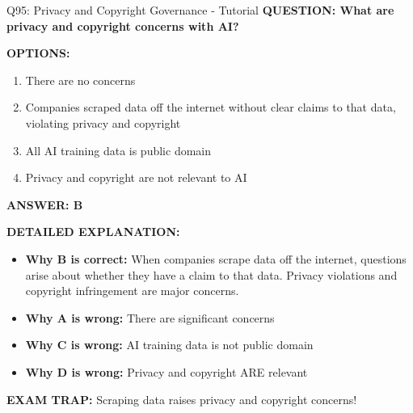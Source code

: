 \documentclass[8pt]{beamer}
\begin{document}
	\begin{frame}{Q95: Privacy and Copyright Governance - Tutorial}
		\fontsize{6.5}{7.5}\selectfont
		\textbf{QUESTION: What are privacy and copyright concerns with AI?}
		
		\vspace{0.1cm}
		\textbf{OPTIONS:}
		\begin{enumerate}
			\item There are no concerns
			\item Companies scraped data off the internet without clear claims to that data, violating privacy and copyright
			\item All AI training data is public domain
			\item Privacy and copyright are not relevant to AI
		\end{enumerate}
		
		\vspace{0.1cm}
		\textcolor{myblue}{\textbf{ANSWER: B}}
		
		\vspace{0.1cm}
		\textbf{DETAILED EXPLANATION:}
		\begin{itemize}
			\item \textbf{Why B is correct:} When companies scrape data off the internet, questions arise about whether they have a claim to that data. Privacy violations and copyright infringement are major concerns.
			\item \textbf{Why A is wrong:} There are significant concerns
			\item \textbf{Why C is wrong:} AI training data is not public domain
			\item \textbf{Why D is wrong:} Privacy and copyright ARE relevant
		\end{itemize}
		
		\textcolor{myred}{\textbf{EXAM TRAP:}} Scraping data raises \textcolor{myblue}{privacy and copyright concerns}!
	\end{frame}
	
	
\end{document}
